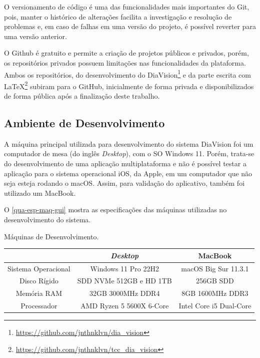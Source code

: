 O versionamento de código é uma das funcionalidades mais importantes do Git, pois, manter o histórico de alterações
facilita a investigação e resolução de problemas e, em caso de falhas em uma versão do projeto, é possível reverter para uma
versão anterior.

O Github é gratuito e permite a criação de projetos públicos e privados, porém, os repositórios privados possuem limitações
nas funcionalidades da plataforma. Ambos os repositórios, do desenvolvimento do DiaVision\footnote{\url{https://github.com/jnthnklvn/dia_vision}}
e da parte escrita com LaTeX\footnote{\url{https://github.com/jnthnklvn/tcc_dia_vision}} subiram para o GitHub,
inicialmente de forma privada e disponibilizados de forma pública após a finalização deste trabalho.

\subsection{Ambiente de Desenvolvimento}

A máquina principal utilizada para desenvolvimento do sistema DiaVision foi um computador de mesa (do inglês \emph{Desktop}), com o SO Windows 11.
Porém, trata-se do desenvolvimento de uma aplicação multiplataforma e não é possível testar a aplicação para o sistema operacional
iOS, da Apple, em um computador que não seja esteja rodando o macOS. Assim, para validação do aplicativo, também foi
utilizado um MacBook.

O \autoref{qua-esp-maq-gui} mostra as especificações das máquinas utilizadas no desenvolvimento do sistema.

\begin{quadro}[htb!]
    \begin{center}
        \ABNTEXfontereduzida
        \caption{\label{qua-esp-maq-gui}Máquinas de Desenvolvimento.}
        \begin{tabular}{|c|c|c|}
            \hline
                                & \textbf{\emph{Desktop}}  & \textbf{MacBook}        \\
            \hline
            Sistema Operacional & Windows 11 Pro 22H2      & macOS Big Sur 11.3.1    \\
            \hline
            Disco Rígido        & SDD NVMe 512GB e HD 1TB  & 256GB SDD               \\
            \hline
            Memória RAM         & 32GB 3000MHz DDR4        & 8GB 1600MHz DDR3        \\
            \hline
            Processador         & AMD Ryzen 5 5600X 6-Core & Intel Core i5 Dual-Core \\
            \hline
        \end{tabular}
    \end{center}
\end{quadro}

